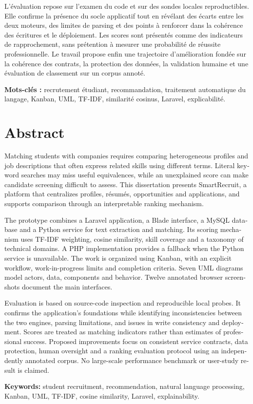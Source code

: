 L'évaluation repose sur l'examen du code et sur des sondes locales reproductibles. Elle confirme la présence du socle applicatif tout en révélant des écarts entre les deux moteurs, des limites de parsing et des points à renforcer dans la cohérence des écritures et le déploiement. Les scores sont présentés comme des indicateurs de rapprochement, sans prétention à mesurer une probabilité de réussite professionnelle. Le travail propose enfin une trajectoire d'amélioration fondée sur la cohérence des contrats, la protection des données, la validation humaine et une évaluation de classement sur un corpus annoté.

\noindent\textbf{Mots-clés :} recrutement étudiant, recommandation, traitement automatique du langage, Kanban, UML, TF-IDF, similarité cosinus, Laravel, explicabilité.

\chapter*{Abstract}
\begin{otherlanguage}{english}
Matching students with companies requires comparing heterogeneous profiles and job descriptions that often express related skills using different terms. Literal keyword searches may miss useful equivalences, while an unexplained score can make candidate screening difficult to assess. This dissertation presents SmartRecruit, a platform that centralizes profiles, résumés, opportunities and applications, and supports comparison through an interpretable ranking mechanism.

The prototype combines a Laravel application, a Blade interface, a MySQL database and a Python service for text extraction and matching. Its scoring mechanism uses TF-IDF weighting, cosine similarity, skill coverage and a taxonomy of technical domains. A PHP implementation provides a fallback when the Python service is unavailable. The work is organized using Kanban, with an explicit workflow, work-in-progress limits and completion criteria. Seven UML diagrams model actors, data, components and behavior. Twelve annotated browser screenshots document the main interfaces.

Evaluation is based on source-code inspection and reproducible local probes. It confirms the application's foundations while identifying inconsistencies between the two engines, parsing limitations, and issues in write consistency and deployment. Scores are treated as matching indicators rather than estimates of professional success. Proposed improvements focus on consistent service contracts, data protection, human oversight and a ranking evaluation protocol using an independently annotated corpus. No large-scale performance benchmark or user-study result is claimed.

\noindent\textbf{Keywords:} student recruitment, recommendation, natural language processing, Kanban, UML, TF-IDF, cosine similarity, Laravel, explainability.
\end{otherlanguage}

